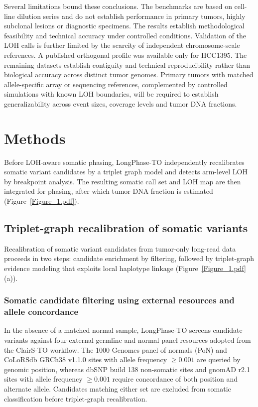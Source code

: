 \documentclass[pdflatex,sn-nature]{sn-jnl}
\begin{document}
Several limitations bound these conclusions. The benchmarks are based on cell-line dilution series and do not establish performance in primary tumors, highly subclonal lesions or diagnostic specimens. The results establish methodological feasibility and technical accuracy under controlled conditions. Validation of the LOH calls is further limited by the scarcity of independent chromosome-scale references. A published orthogonal profile was available only for HCC1395. The remaining datasets establish contiguity and technical reproducibility rather than biological accuracy across distinct tumor genomes. Primary tumors with matched allele-specific array or sequencing references, complemented by controlled simulations with known LOH boundaries, will be required to establish generalizability across event sizes, coverage levels and tumor DNA fractions.

\section{Methods}

Before LOH-aware somatic phasing, LongPhase-TO independently recalibrates somatic variant candidates by a triplet graph model and detects arm-level LOH by breakpoint analysis. The resulting somatic call set and LOH map are then integrated for phasing, after which tumor DNA fraction is estimated (Figure~\ref{Figure_1.pdf}).

\subsection{Triplet-graph recalibration of somatic variants}

Recalibration of somatic variant candidates from tumor-only long-read data proceeds in two steps: candidate enrichment by filtering, followed by triplet-graph evidence modeling that exploits local haplotype linkage (Figure~\ref{Figure_1.pdf}(a)).

\subsubsection{Somatic candidate filtering using external resources and allele concordance}

In the absence of a matched normal sample, LongPhase-TO screens candidate variants against four external germline and normal-panel resources adopted from the ClairS-TO workflow. The 1000 Genomes panel of normals (PoN) and CoLoRSdb GRCh38 v1.1.0 sites with allele frequency $\ge 0.001$ are queried by genomic position, whereas dbSNP build 138 non-somatic sites and gnomAD r2.1 sites with allele frequency $\ge 0.001$ require concordance of both position and alternate allele. Candidates matching either set are excluded from somatic classification before triplet-graph recalibration.
\end{document}
